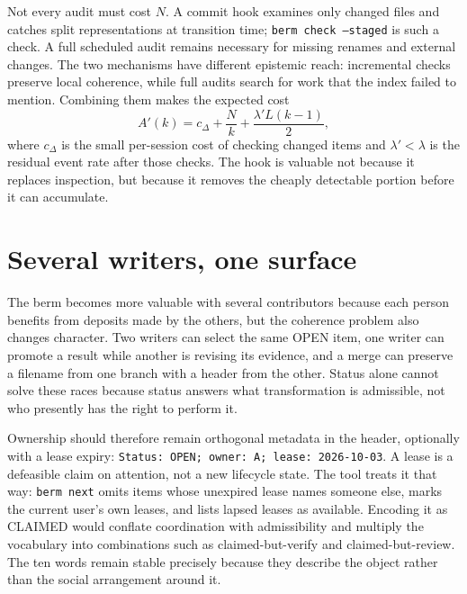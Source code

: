 \documentclass[11pt]{article}
\newcommand{\st}[1]{\textsf{#1}}
\begin{document}
Not every audit must cost $N$. A commit hook examines only changed files and catches split representations at transition time; \texttt{berm check --staged} is such a check. A full scheduled audit remains necessary for missing renames and external changes. The two mechanisms have different epistemic reach: incremental checks preserve local coherence, while full audits search for work that the index failed to mention. Combining them makes the expected cost
\[
                  A'(k)=c_{\Delta}+\frac{N}{k}+\frac{\lambda' L(k-1)}{2},
\]
where $c_{\Delta}$ is the small per-session cost of checking changed items and $\lambda'<\lambda$ is the residual event rate after those checks. The hook is valuable not because it replaces inspection, but because it removes the cheaply detectable portion before it can accumulate.

\section{Several writers, one surface}\label{sec:writers}

The berm becomes more valuable with several contributors because each person benefits from deposits made by the others, but the coherence problem also changes character. Two writers can select the same \st{OPEN} item, one writer can promote a result while another is revising its evidence, and a merge can preserve a filename from one branch with a header from the other. Status alone cannot solve these races because status answers what transformation is admissible, not who presently has the right to perform it.

Ownership should therefore remain orthogonal metadata in the header, optionally with a lease expiry: \texttt{Status: OPEN; owner: A; lease: 2026-10-03}. A lease is a defeasible claim on attention, not a new lifecycle state. The tool treats it that way: \texttt{berm next} omits items whose unexpired lease names someone else, marks the current user's own leases, and lists lapsed leases as available. Encoding it as \st{CLAIMED} would conflate coordination with admissibility and multiply the vocabulary into combinations such as claimed-but-verify and claimed-but-review. The ten words remain stable precisely because they describe the object rather than the social arrangement around it.
\end{document}
